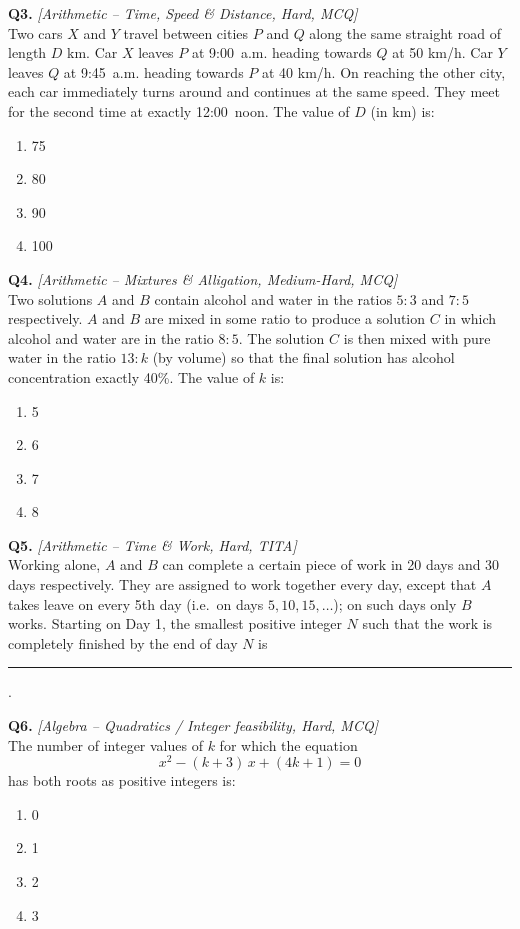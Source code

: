 \documentclass[11pt,a4paper]{article}
\begin{document}
\textbf{Q3.} \textit{[Arithmetic -- Time, Speed \& Distance, Hard, MCQ]}\\
Two cars $X$ and $Y$ travel between cities $P$ and $Q$ along the same straight road of length $D$ km. Car $X$ leaves $P$ at 9:00~a.m. heading towards $Q$ at 50 km/h. Car $Y$ leaves $Q$ at 9:45~a.m. heading towards $P$ at 40 km/h. On reaching the other city, each car immediately turns around and continues at the same speed. They meet for the second time at exactly 12:00~noon. The value of $D$ (in km) is:
\begin{enumerate}[label=(\Alph*)]
  \item 75
  \item 80
  \item 90
  \item 100
\end{enumerate}

\textbf{Q4.} \textit{[Arithmetic -- Mixtures \& Alligation, Medium-Hard, MCQ]}\\
Two solutions $A$ and $B$ contain alcohol and water in the ratios $5:3$ and $7:5$ respectively. $A$ and $B$ are mixed in some ratio to produce a solution $C$ in which alcohol and water are in the ratio $8:5$. The solution $C$ is then mixed with pure water in the ratio $13:k$ (by volume) so that the final solution has alcohol concentration exactly 40\%. The value of $k$ is:
\begin{enumerate}[label=(\Alph*)]
  \item 5
  \item 6
  \item 7
  \item 8
\end{enumerate}

\textbf{Q5.} \textit{[Arithmetic -- Time \& Work, Hard, TITA]}\\
Working alone, $A$ and $B$ can complete a certain piece of work in 20 days and 30 days respectively. They are assigned to work together every day, except that $A$ takes leave on every 5th day (i.e.\ on days $5, 10, 15, \dots$); on such days only $B$ works. Starting on Day 1, the smallest positive integer $N$ such that the work is completely finished by the end of day $N$ is \rule{2cm}{0.4pt}.

\textbf{Q6.} \textit{[Algebra -- Quadratics / Integer feasibility, Hard, MCQ]}\\
The number of integer values of $k$ for which the equation
\[
x^{2} - (k+3)\,x + (4k+1) = 0
\]
has both roots as positive integers is:
\begin{enumerate}[label=(\Alph*)]
  \item 0
  \item 1
  \item 2
  \item 3
\end{enumerate}
\end{document}
